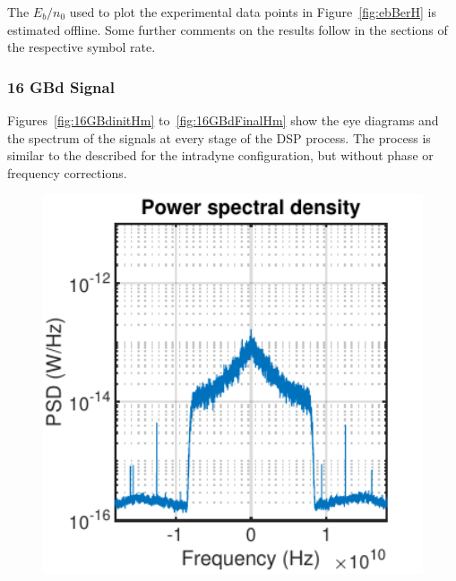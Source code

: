 	The $E_b/n_0$ used to plot the experimental data points in
	Figure~\ref{fig:ebBerH} is estimated offline. Some further comments on the
	results follow in the sections of the respective symbol rate.


	\subsubsection{16 GBd Signal}

	Figures~\ref{fig:16GBdinitHm} to~\ref{fig:16GBdFinalHm} show the eye diagrams and the spectrum of the signals at every stage of the DSP process. The process is similar to the described for the intradyne configuration, but without phase or frequency corrections.

	\begin{figure}[H]
		\centering
		\begin{minipage}{0.3\textwidth}
			\centering
			\includegraphics[width=1\textwidth]
			{./sdf/m_qam_system/figures/experimental/results/DSP_homodyne/0noEDFA_16_homodyne_16_6_spectrum.pdf}\\
			\label{fig:16GBdEyeBefFecHm}
		\end{minipage}
		\begin{minipage}{0.3\textwidth}
			\centering

\end{minipage}
\end{figure}
